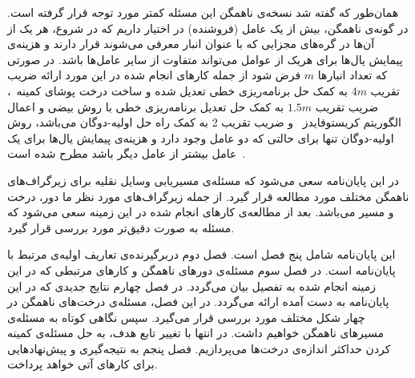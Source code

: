همان‌طور که گفته شد نسخه‌ی ناهمگن این مسئله کمتر مورد توجه قرار گرفته است. در گونه‌ی ناهمگن، بیش از یک عامل (فروشنده) در اختیار داریم که در شروع، هر یک از آن‌ها در گره‌های مجزایی که با عنوان انبار معرفی می‌شوند قرار دارند و هزینه‌ی پیمایش یال‌ها برای هریک از عوامل می‌تواند متفاوت از سایر عامل‌ها باشد. در صورتی که تعداد انبارها $m$ فرض شود از جمله کارهای انجام شده در این مورد ارائه ضریب تقریب $4m$ به کمک حل برنامه‌ریزی خطی تعدیل شده  و ساخت درخت پوشای کمینه~\cite{4m}، ضریب تقریب $1.5m$ به کمک حل تعدیل برنامه‌ریزی خطی با روش بیضی و اعمال الگوریتم کریستوفایدز~\cite{1.5m} و ضریب تقریب 2 به کمک راه حل اولیه-دوگان می‌باشد، روش اولیه-دوگان تنها برای حالتی که دو عامل وجود دارد و هزینه‌ی پیمایش یال‌ها برای یک عامل بیشتر از عامل دیگر باشد مطرح شده است~\cite{Primal_Dual}. 



در این پایان‌نامه سعی می‌شود که مسئله‌ی مسیریابی وسایل نقلیه برای زیرگراف‌های ناهمگن مختلف مورد مطالعه قرار گیرد. از جمله زیرگراف‌های مورد نظر ما دور، درخت و مسیر می‌باشد. بعد از مطالعه‌ی کارهای انجام شده در این زمینه سعی می‌شود که مسئله به صورت دقیق‌تر مورد بررسی قرار گیرد.


این پایان‌نامه شامل پنج فصل است. 
فصل دوم دربرگیرنده‌ی تعاریف اولیه‌ی مرتبط با پایان‌نامه است. 
در فصل سوم مسئله‌ی دورهای ناهمگن و کارهای مرتبطی که در این زمینه انجام شده به تفصیل بیان می‌گردد. 
در فصل چهارم نتایج جدیدی که در این پایان‌نامه به دست آمده ارائه می‌گردد. در این فصل، مسئله‌ی درخت‌های ناهمگن در چهار شکل مختلف مورد بررسی قرار می‌گیرد. سپس نگاهی کوتاه به مسئله‌ی مسیرهای ناهمگن خواهیم داشت. در انتها با تغییر تابع هدف، به حل مسئله‌ی کمینه کردن حداکثر اندازه‌ی درخت‌ها می‌پردازیم.
فصل پنجم به نتیجه‌گیری و پیش‌نهادهایی برای کارهای آتی خواهد پرداخت.
